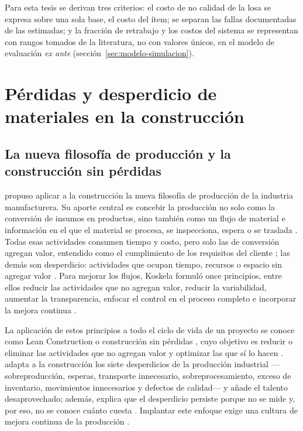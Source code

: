 Para esta tesis se derivan tres criterios: el costo de no calidad de la losa se expresa sobre una sola base, el costo del ítem; se separan las fallas documentadas de las estimadas; y la fracción de retrabajo y los costos del sistema se representan con rangos tomados de la literatura, no con valores únicos, en el modelo de evaluación \emph{ex ante} (sección~\ref{sec:modelo-simulacion}).

\section{Pérdidas y desperdicio de materiales en la construcción}
\label{sec:perdidas}

\subsection{La nueva filosofía de producción y la construcción sin pérdidas}

\textcite{koskela1992} propuso aplicar a la construcción la nueva filosofía de producción de la industria manufacturera. Su aporte central es concebir la producción no solo como la conversión de insumos en productos, sino también como un flujo de material e información en el que el material se procesa, se inspecciona, espera o se traslada \parencite[p.~15]{koskela1992}. Todas esas actividades consumen tiempo y costo, pero solo las de conversión agregan valor, entendido como el cumplimiento de los requisitos del cliente \parencite[pp.~15--16]{koskela1992}; las demás son desperdicio: actividades que ocupan tiempo, recursos o espacio sin agregar valor \parencite[p.~17]{koskela1992}. Para mejorar los flujos, Koskela formuló once principios, entre ellos reducir las actividades que no agregan valor, reducir la variabilidad, aumentar la transparencia, enfocar el control en el proceso completo e incorporar la mejora continua \parencite[p.~16]{koskela1992}.

La aplicación de estos principios a todo el ciclo de vida de un proyecto se conoce como Lean Construction o construcción sin pérdidas \parencite[p.~26]{pons2014}, cuyo objetivo es reducir o eliminar las actividades que no agregan valor y optimizar las que sí lo hacen \parencite[p.~35]{porrasdiaz2014}. \textcite[pp.~18--19]{pons2014} adapta a la construcción los siete desperdicios de la producción industrial ---sobreproducción, esperas, transporte innecesario, sobreprocesamiento, exceso de inventario, movimientos innecesarios y defectos de calidad--- y añade el talento desaprovechado; además, explica que el desperdicio persiste porque no se mide y, por eso, no se conoce cuánto cuesta \parencite[p.~20]{pons2014}. Implantar este enfoque exige una cultura de mejora continua de la producción \parencite[p.~38]{porrasdiaz2014}.

